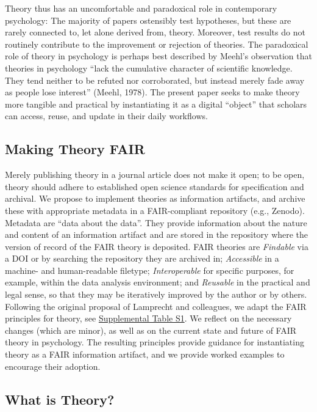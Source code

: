 \documentclass[
  man, noextraspace,floatsintext]{apa6}
\begin{document}
Theory thus has an uncomfortable and paradoxical role in contemporary psychology:
The majority of papers ostensibly test hypotheses,
but these are rarely connected to, let alone derived from, theory.
Moreover, test results do not routinely contribute to the improvement or rejection of theories.
The paradoxical role of theory in psychology is perhaps best described by Meehl's observation that theories in psychology ``lack the cumulative character of scientific knowledge. They tend neither to be refuted nor corroborated, but instead merely fade away as people lose interest'' (Meehl, 1978).
The present paper seeks to make theory more tangible and practical by instantiating it as a digital ``object'' that scholars can access, reuse, and update in their daily workflows.

\subsection{Making Theory FAIR}\label{making-theory-fair}

Merely publishing theory in a journal article does not make it open;
to be open, theory should adhere to established open science standards for specification and archival.
We propose to implement theories as information artifacts,
and archive these with appropriate metadata in a FAIR-compliant repository (e.g., Zenodo).
Metadata are ``data about the data''.
They provide information about the nature and content of an information artifact and are stored in the repository where the version of record of the FAIR theory is deposited.
FAIR theories are \emph{Findable} via a DOI or by searching the repository they are archived in;
\emph{Accessible} in a machine- and human-readable filetype;
\emph{Interoperable} for specific purposes, for example, within the data analysis environment;
and \emph{Reusable} in the practical and legal sense, so that they may be iteratively improved by the author or by others.
Following the original proposal of Lamprecht and colleagues,
we adapt the FAIR principles for theory, see \href{https://github.com/cjvanlissa/fair_theory/blob/main/fair_principles.csv}{Supplemental Table S1}.
We reflect on the necessary changes (which are minor),
as well as on the current state and future of FAIR theory in psychology.
The resulting principles provide guidance for instantiating theory as a FAIR information artifact,
and we provide worked examples to encourage their adoption.

\subsection{What is Theory?}\label{what-is-theory}
\end{document}

